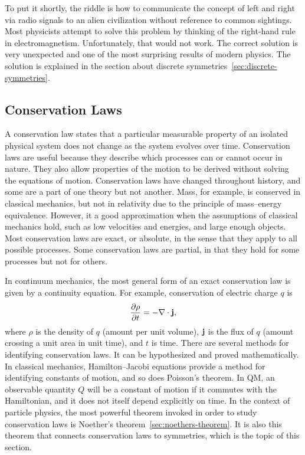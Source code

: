 To put it shortly, the riddle is how to communicate the concept of left and right via radio signals to an alien civilization without reference to common sightings. Most physicists attempt to solve this problem by thinking of the right-hand rule in electromagnetism. Unfortunately, that would not work. The correct solution is very unexpected and one of the most surprising results of modern physics. The solution is explained in the section about discrete symmetries~\ref{sec:discrete-symmetries}.

\subsection{Conservation Laws}

A conservation law states that a particular measurable property of an isolated physical system does not change as the system evolves over time. Conservation laws are useful because they describe which processes can or cannot occur in nature. They also allow properties of the motion to be derived without solving the equations of motion. Conservation laws have changed throughout history, and some are a part of one theory but not another. Mass, for example, is conserved in classical mechanics, but not in relativity due to the principle of mass–energy equivalence. However, it a good approximation when the assumptions of classical mechanics hold, such as low velocities and energies, and large enough objects. Most conservation laws are exact, or absolute, in the sense that they apply to all possible processes. Some conservation laws are partial, in that they hold for some processes but not for others.

In continuum mechanics, the most general form of an exact conservation law is given by a continuity equation. For example, conservation of electric charge $q$ is
\begin{equation}
\pdv{\rho}{t}=-\nabla\cdot\vb{j},
\end{equation}
where $\rho$ is the density of $q$ (amount per unit volume), $\vb{j}$ is the flux of $q$ (amount crossing a unit area in unit time), and $t$ is time. There are several methods for identifying conservation laws. It can be hypothesized and proved mathematically. In classical mechanics, Hamilton–Jacobi equations provide a method for identifying constants of motion, and so does Poisson's theorem. In QM, an observable quantity $Q$ will be a constant of motion if it commutes with the Hamiltonian, and it does not itself depend explicitly on time. In the context of particle physics, the most powerful theorem invoked in order to study conservation laws is Noether's theorem~\ref{sec:noethers-theorem}. It is also this theorem that connects conservation laws to symmetries, which is the topic of this section.


